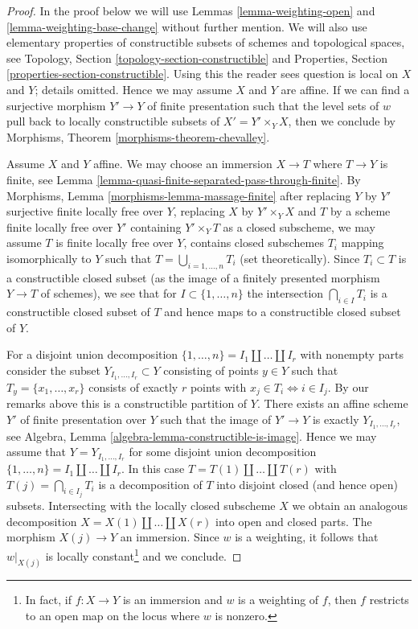\begin{proof}
In the proof below we will use Lemmas \ref{lemma-weighting-open} and
\ref{lemma-weighting-base-change} without further mention.
We will also use elementary properties of constructible subsets
of schemes and topological spaces, see
Topology, Section \ref{topology-section-constructible} and
Properties, Section \ref{properties-section-constructible}.
Using this the reader sees question is local on $X$ and $Y$;
details omitted. Hence we may assume $X$ and $Y$ are affine.
If we can find a surjective morphism $Y' \to Y$
of finite presentation such that the level sets of $w$
pull back to locally constructible subsets of $X' = Y' \times_Y X$,
then we conclude by Morphisms, Theorem \ref{morphisms-theorem-chevalley}.

\medskip\noindent
Assume $X$ and $Y$ affine. We may choose an immersion $X \to T$
where $T \to Y$ is finite, see
Lemma \ref{lemma-quasi-finite-separated-pass-through-finite}.
By Morphisms, Lemma \ref{morphisms-lemma-massage-finite}
after replacing $Y$ by $Y'$ surjective finite locally free over $Y$,
replacing $X$ by $Y' \times_Y X$ and $T$ by a scheme finite locally
free over $Y'$ containing $Y' \times_Y T$ as a closed subscheme,
we may assume $T$ is finite locally free over $Y$,
contains closed subschemes $T_i$ mapping isomorphically to $Y$
such that $T = \bigcup_{i = 1, \ldots, n} T_i$ (set theoretically).
Since $T_i \subset T$ is a constructible closed subset (as the image
of a finitely presented morphism $Y \to T$ of schemes), we see
that for $I \subset \{1, \ldots, n\}$ the intersection
$\bigcap_{i \in I} T_i$ is a constructible closed subset of $T$
and hence maps to a constructible closed subset of $Y$.

\medskip\noindent
For a disjoint union decomposition
$\{1, \ldots, n\} = I_1 \amalg \ldots \amalg I_r$ with nonempty parts
consider the subset $Y_{I_1, \ldots, I_r} \subset Y$
consisting of points $y \in Y$ such that $T_y = \{x_1, \ldots, x_r\}$
consists of exactly $r$ points with $x_j \in T_i \Leftrightarrow i \in I_j$.
By our remarks above this is a constructible partition of $Y$.
There exists an affine scheme $Y'$ of finite presentation
over $Y$ such that the image of $Y' \to Y$ is exactly
$Y_{I_1, \ldots, I_r}$, see Algebra, Lemma
\ref{algebra-lemma-constructible-is-image}.
Hence we may assume that $Y = Y_{I_1, \ldots, I_r}$ for some
disjoint union decomposition
$\{1, \ldots, n\} = I_1 \amalg \ldots \amalg I_r$.
In this case $T = T(1) \amalg \ldots \amalg T(r)$ with
$T(j) = \bigcap_{i \in I_j} T_i$
is a decomposition of $T$ into disjoint closed (and hence open) subsets.
Intersecting with the locally closed subscheme $X$ we obtain an analogous
decomposition $X = X(1) \amalg \ldots \amalg X(r)$ into open and closed parts.
The morphism $X(j) \to Y$ an immersion.
Since $w$ is a weighting, it follows that $w|_{X(j)}$
is locally constant\footnote{In fact, if $f : X \to Y$ is an
immersion and $w$ is a weighting of $f$, then $f$ restricts to an
open map on the locus where $w$ is nonzero.} and we conclude.
\end{proof}

